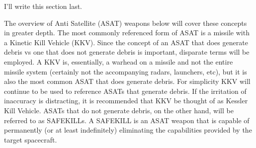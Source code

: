 {}

\titlenote{}

\maketitle

I’ll write this section last.

The overview of Anti Satellite (ASAT) weapons below will cover these
concepts in greater depth.  The most commonly referenced form of ASAT
is a missile with a Kinetic Kill Vehicle (KKV).  Since the concept of
an ASAT that does generate debris vs one that does not generate debris
is important, disparate terms will be employed.  A KKV is,
essentially, a warhead on a missile and not the entire missile system
(certainly not the accompanying radars, launchers, etc), but it is
also the most common ASAT that does generate debris.  For simplicity
KKV will continue to be used to reference ASATs that generate debris.
If the irritation of inaccuracy is distracting, it is recommended that
KKV be thought of as Kessler Kill Vehicle.  ASATs that do not generate
debris, on the other hand, will be referred to as SAFEKILLs.  A
SAFEKILL is an ASAT weapon that is capable of permanently (or at least
indefinitely) eliminating the capabilities provided by the target
spacecraft.
